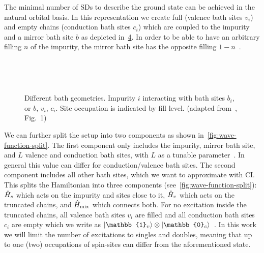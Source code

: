 The minimal number of SDs
to describe the ground state can be achieved in the natural orbital basis.
In this representation we create full (valence bath sites $v_i$)
and empty chains (conduction bath sites $c_i$)
which are coupled to the impurity and a mirror bath site $b$
as depicted in~\cref{subfig:geometry-nat}.
In order to be able to have an arbitrary filling $n$ of the impurity,
the mirror bath site has the opposite filling $1 - n$~\cite{Lu2014}.

\begin{figure}
    \centering
    \begin{subfigure}{0.3\textwidth}
        \centering
        
        \caption{}
        \label{subfig:geometry-AIM}
    \end{subfigure}
    ~
    \begin{subfigure}{0.3\textwidth}
        \centering
        
        \caption{}
        \label{subfig:geometry-tri}
    \end{subfigure}
    ~
    \begin{subfigure}{0.3\textwidth}
        \centering
        
        \caption{}
        \label{subfig:geometry-nat}
    \end{subfigure}
    \caption{
        Different bath geometries.
        Impurity $i$ interacting with bath sites $b_i$, or $b$, $v_i$, $c_i$.
        Site occupation is indicated by fill level.
        (adapted from~\cite{Lu2014}, Fig.~1)
    }
\end{figure}

We can further split the setup into two components as
shown in~\cref{fig:wave-function-split}.
The first component only includes the impurity, mirror bath site,
and $L$ valence and conduction bath sites,
with $L$ as a tunable parameter~\cite{Lu2019}.
In general this value can differ for
conduction/valence bath sites.
The second component includes all other bath sites,
which we want to approximate with CI.
This splits the Hamiltonian into three components
(see~\cref{fig:wave-function-split}):
$\hat{H}_s$ which acts on the impurity and sites close to it,
$\hat{H}_v$ which acts on the truncated chains,
and $\hat{H}_\text{mix}$ which connects both.
For no excitation inside the truncated chains,
all valence bath sites $v_i$ are filled
and all conduction bath sites $c_i$ are empty which we write as
$\ket{\mathbb{1}_v} \otimes \ket{\mathbb{0}_c}$~\cite{Lu2019}.
In this work we will limit the number of excitations to singles and doubles,
meaning that up to one (two) occupations of spin-sites
can differ from the aforementioned state.

